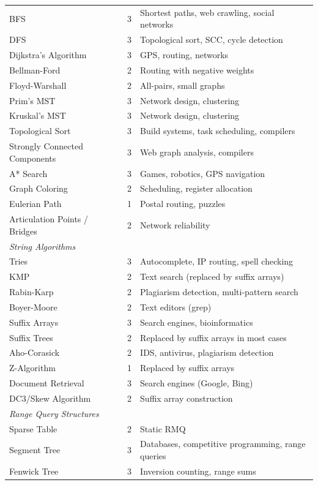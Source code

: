 \begin{center}
\begin{tabular}{lcl}
\midrule
BFS & 3 & Shortest paths, web crawling, social networks \\
DFS & 3 & Topological sort, SCC, cycle detection \\
Dijkstra's Algorithm & 3 & GPS, routing, networks \\
Bellman-Ford & 2 & Routing with negative weights \\
Floyd-Warshall & 2 & All-pairs, small graphs \\
Prim's MST & 3 & Network design, clustering \\
Kruskal's MST & 3 & Network design, clustering \\
Topological Sort & 3 & Build systems, task scheduling, compilers \\
Strongly Connected Components & 3 & Web graph analysis, compilers \\
A* Search & 3 & Games, robotics, GPS navigation \\
Graph Coloring & 2 & Scheduling, register allocation \\
Eulerian Path & 1 & Postal routing, puzzles \\
Articulation Points / Bridges & 2 & Network reliability \\
\midrule
\multicolumn{3}{l}{\textit{String Algorithms}} \\
\midrule
Tries & 3 & Autocomplete, IP routing, spell checking \\
KMP & 2 & Text search (replaced by suffix arrays) \\
Rabin-Karp & 2 & Plagiarism detection, multi-pattern search \\
Boyer-Moore & 2 & Text editors (grep) \\
Suffix Arrays & 3 & Search engines, bioinformatics \\
Suffix Trees & 2 & Replaced by suffix arrays in most cases \\
Aho-Corasick & 2 & IDS, antivirus, plagiarism detection \\
Z-Algorithm & 1 & Replaced by suffix arrays \\
Document Retrieval & 3 & Search engines (Google, Bing) \\
DC3/Skew Algorithm & 2 & Suffix array construction \\
\midrule
\multicolumn{3}{l}{\textit{Range Query Structures}} \\
\midrule
Sparse Table & 2 & Static RMQ \\
Segment Tree & 3 & Databases, competitive programming, range queries \\
Fenwick Tree & 3 & Inversion counting, range sums \\

\end{tabular}
\end{center}
